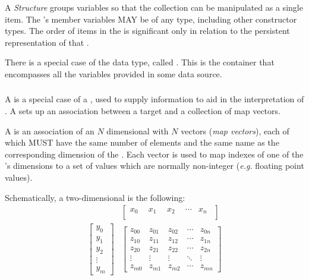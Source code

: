\documentclass[justify]{nasa-ese}
\renewcommand{\new}[1]{\emph{#1}}
\begin{document}
\subsubsection{\Structure}
\label{sec-constructor-structure}

A \new{Structure} groups variables so that the collection can be manipulated
as a single item. The \Structure's member variables MAY be of any type,
including other constructor types. The order of items in the \Structure is
significant only in relation to the persistent representation of that
\Structure.

There is a special case of the \Structure data type, called \Dataset. This is
the container that encompasses all the variables provided in some data
source.

\subsubsection{\Grid}
\label{sec-constructor-grid}

A \Grid is a special case of a \Structure, used to supply information to aid
in the interpretation of \Arrays. A \Grid sets up an association between a
target \Array and a collection of map vectors.

A \Grid is an association of an $N$ dimensional \Array with $N$ vectors
(\new{map vectors}), each of which MUST have the same number of elements and
the same name as the
corresponding dimension of the \Array. Each vector is used to map indexes of
one of the \Array's dimensions to a set of values which are normally
non-integer ({\it e.g.} floating point values).

Schematically, a two-dimensional \Grid is the following:
\T\nopagebreak
\begin{displaymath}
  \begin{array}{cl}  & \left[
      \begin{array}{ccccc}
        x_0~~  & x_1~~    & x_2~~    & \cdots & x_n~~     \\
      \end{array} \right] \\[2mm] \left[
      \begin{array}{c}
        y_0 \\ y_1 \\ y_2 \\ \vdots \\ y_m
      \end{array} \right] & \left[
      \begin{array}{ccccc}
        z_{0 0} & z_{0 1} & z_{0 2} & \cdots & z_{0 n} \\
        z_{1 0} & z_{1 1} & z_{1 2} & \cdots & z_{1 n} \\
        z_{2 0} & z_{2 1} & z_{2 2} & \cdots & z_{2 n} \\
        \vdots  & \vdots  & \vdots  & \ddots & \vdots  \\
        z_{m 0} & z_{m 1} & z_{m 2} & \cdots & z_{m n} 
      \end{array} \right]
  \end{array}
\end{displaymath}
\end{document}
